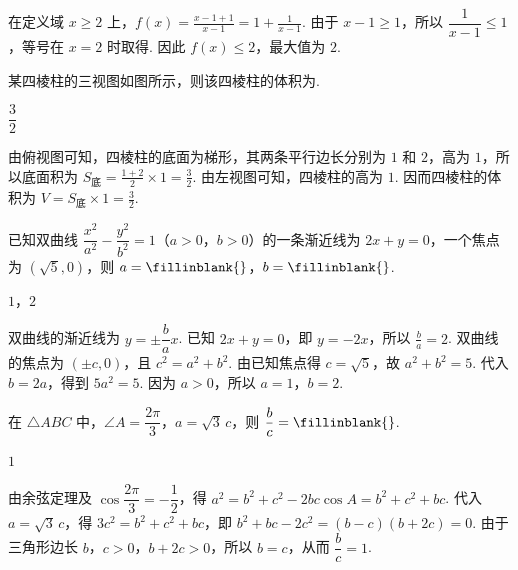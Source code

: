 \begin{solution}
在定义域 \(x\geq2\) 上，\(f(x)=\frac{x-1+1}{x-1}=1+\frac1{x-1}\).
由于 \(x-1\geq1\)，所以 \(\dfrac1{x-1}\leq1\)，等号在 \(x=2\) 时取得. 因此 \(f(x)\leq2\)，最大值为 \(2\).
\end{solution}

\begin{problem}
某四棱柱的三视图如图所示，则该四棱柱的体积为\fillinblank{}.

\end{problem}

\begin{answer}
\(\dfrac{3}{2}\)
\end{answer}

\begin{solution}
由俯视图可知，四棱柱的底面为梯形，其两条平行边长分别为 \(1\) 和 \(2\)，高为 \(1\)，所以底面积为 \(S_{\text{底}}=\frac{1+2}{2}\times1=\frac32\). 由左视图可知，四棱柱的高为 \(1\). 因而四棱柱的体积为 \(V=S_{\text{底}}\times1=\frac32\).
\end{solution}

\begin{problem}
已知双曲线 \(\dfrac{x^2}{a^2}-\dfrac{y^2}{b^2}=1\)（\(a>0\)，\(b>0\)）的一条渐近线为 \(2x+y=0\)，一个焦点为 \((\sqrt5,0)\)，则 \(a=\fillinblank{}\)，\(b=\fillinblank{}\).
\end{problem}

\begin{answer}
\(1\)，\(2\)
\end{answer}

\begin{solution}
双曲线的渐近线为 \(y=\pm\dfrac ba x\). 已知 \(2x+y=0\)，即 \(y=-2x\)，所以 \(\frac ba=2\). 双曲线的焦点为 \((\pm c,0)\)，且 \(c^2=a^2+b^2\). 由已知焦点得 \(c=\sqrt5\)，故 \(a^2+b^2=5\).
代入 \(b=2a\)，得到 \(5a^2=5\). 因为 \(a>0\)，所以 \(a=1\)，\(b=2\).
\end{solution}

\begin{problem}
在 \(\triangle ABC\) 中，\(\angle A=\dfrac{2\pi}{3}\)，\(a=\sqrt3\,c\)，则 \(\dfrac{b}{c}=\fillinblank{}\).
\end{problem}

\begin{answer}
\(1\)
\end{answer}

\begin{solution}
由余弦定理及 \(\cos\dfrac{2\pi}{3}=-\dfrac12\)，得 \(a^2=b^2+c^2-2bc\cos A=b^2+c^2+bc\).
代入 \(a=\sqrt3\,c\)，得
\(3c^2=b^2+c^2+bc\)，即 \(b^2+bc-2c^2=(b-c)(b+2c)=0\).
由于三角形边长 \(b\)，\(c>0\)，\(b+2c>0\)，所以 \(b=c\)，从而 \(\dfrac bc=1\).
\end{solution}

